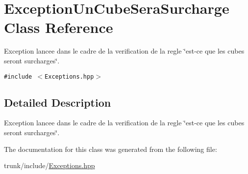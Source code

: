 \hypertarget{classExceptionUnCubeSeraSurcharge}{
\section{ExceptionUnCubeSeraSurcharge Class Reference}
\label{classExceptionUnCubeSeraSurcharge}
}
Exception lancee dans le cadre de la verification de la regle \char`\"{}est-ce que les cubes seront surcharges\char`\"{}.  


{\tt \#include $<$Exceptions.hpp$>$}



\subsection{Detailed Description}
Exception lancee dans le cadre de la verification de la regle \char`\"{}est-ce que les cubes seront surcharges\char`\"{}. 

The documentation for this class was generated from the following file:\begin{CompactItemize}
\item 
trunk/include/\hyperlink{Exceptions_8hpp}{Exceptions.hpp}\end{CompactItemize}
